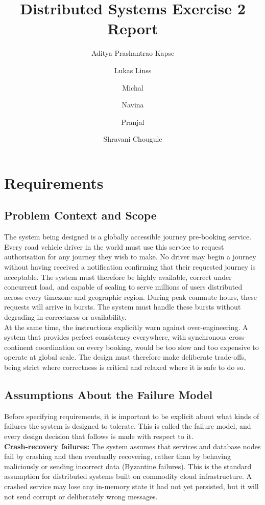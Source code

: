 \documentclass{article}
\title{Distributed Systems Exercise 2 Report}
\author{
    Aditya Prashantrao Kapse \and
    Lukas Linss \and
    Michal \and
    Navina \and
    Pranjal \and
    Shravani Chougule
}
\begin{document}
\maketitle
\tableofcontents
\newpage

\section{Requirements}
\subsection{Problem Context and Scope}

The system being designed is a globally accessible journey pre-booking service. Every road vehicle driver in the world must use this service to request authorisation for any journey they wish to make. No driver may begin a journey without having received a notification confirming that their requested journey is acceptable. The system must therefore be highly available, correct under concurrent load, and capable of scaling to serve millions of users distributed across every timezone and geographic region. During peak commute hours, these requests will arrive in bursts. The system must handle these bursts without degrading in correctness or availability.\\
At the same time, the instructions explicitly warn against over-engineering. A system that provides perfect consistency everywhere, with synchronous cross-continent coordination on every booking, would be too slow and too expensive to operate at global scale. The design must therefore make deliberate trade-offs, being strict where correctness is critical and relaxed where it is safe to do so.

\subsection{Assumptions About the Failure Model}
Before specifying requirements, it is important to be explicit about what kinds of failures the system is designed to tolerate. This is called the failure model, and every design decision that follows is made with respect to it.\\

\textbf{Crash-recovery failures:} The system assumes that services and database nodes fail by crashing and then eventually recovering, rather than by behaving maliciously or sending incorrect data (Byzantine failures). This is the standard assumption for distributed systems built on commodity cloud infrastructure. A crashed service may lose any in-memory state it had not yet persisted, but it will not send corrupt or deliberately wrong messages.
\\
\end{document}

